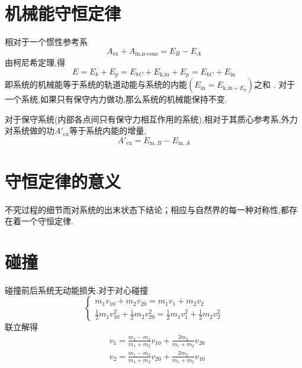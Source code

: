 \newpage
\section{机械能守恒定律}
\jg
\par 相对于一个惯性参考系
\begin{equation}
A_{\text{ex}}+A_{\text{in,n-cons}}=E_B-E_A
\end{equation}
由柯尼希定理,得
\begin{equation}
E=E_k+E_p=E_{kC}+E_{\text{k,in}}+E_p=E_{kC}+E_{\text{in}}
\end{equation}
即系统的机械能等于系统的轨道动能与系统的内能$(E_{\text{in}}=E_{\text{k,in}+E_p})$之和 .
对于一个系统,如果只有保守内力做功,那么系统的机械能保持不变.
\newpage

\jg
\par 对于保守系统(内部各点间只有保守力相互作用的系统),相对于其质心参考系,外力对系统做的功$A'_{\text{ex}}$等于系统内能的增量,
\begin{equation}
A'_{\text{ex}}=E_{\text{in},B}-E_{\text{in},A}
\end{equation}

\section{守恒定律的意义}
不究过程的细节而对系统的出末状态下结论；相应与自然界的每一种对称性,都存在着一个守恒定律.

\section{碰撞}
碰撞前后系统无动能损失.对于对心碰撞
\begin{equation}
\begin{cases}
m_1v_{10}+m_2v_{20}=m_1v_1+m_2v_2\\
\frac{1}{2}m_1v_{10}^2+\frac{1}{2}m_2v_{20}^2=\frac{1}{2}m_1v_{1}^2+\frac{1}{2}m_2v_{2}^2
\end{cases}
\end{equation}
联立解得
\begin{equation}
\begin{split}
&v_1=\frac{m_1-m_2}{m_1+m_2}v_{10}+\frac{2m_2}{m_1+m_2}v_{20}\\
&v_2=\frac{m_1-m_2}{m_1+m_2}v_{20}+\frac{2m_2}{m_1+m_2}v_{10}
\end{split}
\end{equation}

